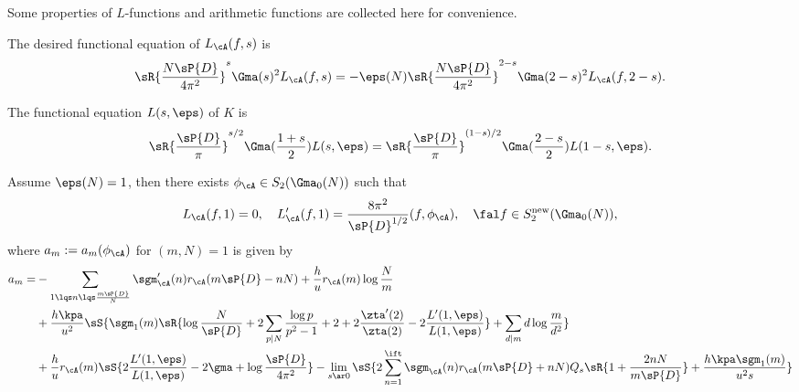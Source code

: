 \documentclass[a4paper, twoside]{article}
\begin{document}

\begin{rcl}
Some properties of $L$-functions and arithmetic functions are collected here for convenience.

The desired functional equation of $L_{\cA}(f,s)$ is
\[
	\sR{\frac{N\sP{D}}{4\pi^{2}}}^{s}\Gma(s)^{2}L_{\cA}(f,s)=-\eps(N)\sR{\frac{N\sP{D}}{4\pi^{2}}}^{2-s}\Gma(2-s)^{2}L_{\cA}(f,2-s).
\]

The functional equation $L(s,\eps)$ of $K$ is
\[
	\sR{\frac{\sP{D}}{\pi}}^{s/2}\Gma(\frac{1+s}{2})L(s,\eps)=\sR{\frac{\sP{D}}{\pi}}^{(1-s)/2}\Gma(\frac{2-s}{2})L(1-s,\eps).
\]

\end{rcl}

\begin{thm}[{\cite[IV.6.9]{GZ1986}}]\label{thm:cform}
	Assume $\eps(N)=1$, then there exists $\phi_{\cA}\in S_{2}(\Gma_{0}(N))$ such that
	\[
		L_{\cA}(f,1)=0,\quad L_{\cA}'(f,1)=\frac{8\pi^{2}}{\sP{D}^{1/2}}(f,\phi_{\cA}),\quad \fal f\in S_{2}^{\mathrm{new}}(\Gma_{0}(N)),
	\]
	where $a_{m}:=a_{m}(\phi_{\cA})$ for $(m,N)=1$ is given by
	\begin{align*}
	  a_{m} = &-\sum_{1\lqs n\lqs \frac{m\sP{D}}{N}}\sgm_{\cA}'(n)r_{\cA}(m\sP{D}-nN)+\frac{h}{u}r_{\cA}(m)\log\frac{N}{m} \\
			  &+\frac{h\kpa}{u^{2}}\sS{\sgm_{1}(m)\sR{\log\frac{N}{\sP{D}}+2\sum_{p\mid N}\frac{\log p}{p^{2}-1}+2+2\frac{\zta'(2)}{\zta(2)}-2\frac{L'(1,\eps)}{L(1,\eps)}}+\sum_{d\mid m}d\log\frac{m}{d^{2}}} \\
			  &+\frac{h}{u}r_{\cA}(m)\sS{2\frac{L'(1,\eps)}{L(1,\eps)}-2\gma+\log\frac{\sP{D}}{4\pi^{2}}}-\lim_{s\ar0}\sS{2\sum_{n=1}^{\ift}\sgm_{\cA}(n)r_{\cA}(m\sP{D}+nN)Q_{s}\sR{1+\frac{2nN}{m\sP{D}}}+\frac{h\kpa\sgm_{1}(m)}{u^{2}s}}
	\end{align*}
\end{thm}
\end{document}
